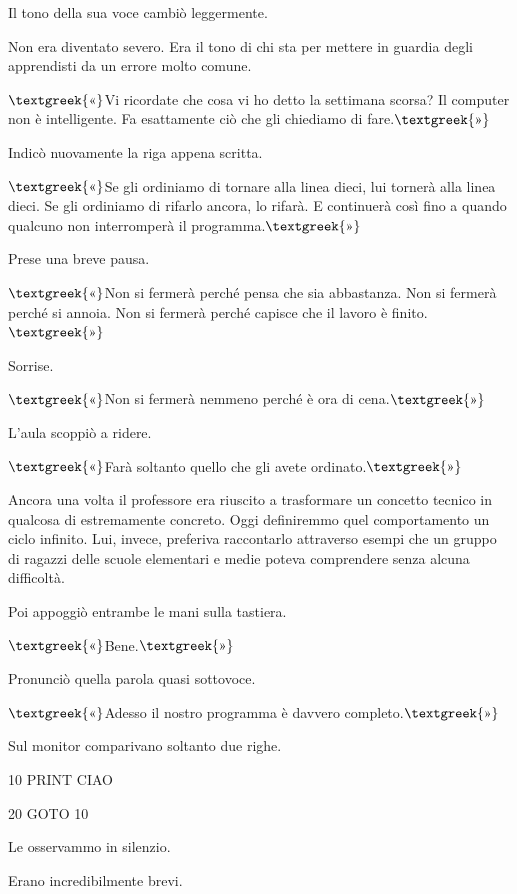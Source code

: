 \documentclass{article}
\begin{document}
Il tono della sua voce cambiò leggermente.

Non era diventato severo. Era il tono di chi sta per mettere in guardia degli apprendisti da un errore molto comune.

$\text{\textgreek{«}}$Vi ricordate che cosa vi ho detto la settimana scorsa? Il computer non è intelligente. Fa
esattamente ciò che gli chiediamo di fare.$\text{\textgreek{»}}$

Indicò nuovamente la riga appena scritta.

$\text{\textgreek{«}}$Se gli ordiniamo di tornare alla linea dieci, lui tornerà alla linea dieci. Se gli ordiniamo di
rifarlo ancora, lo rifarà. E continuerà così fino a quando qualcuno non interromperà il
programma.$\text{\textgreek{»}}$

Prese una breve pausa.

$\text{\textgreek{«}}$Non si fermerà perché pensa che sia abbastanza. Non si fermerà perché si annoia. Non si fermerà
perché capisce che il lavoro è finito.$\text{\textgreek{»}}$

Sorrise.

$\text{\textgreek{«}}$Non si fermerà nemmeno perché è ora di cena.$\text{\textgreek{»}}$

L'aula scoppiò a ridere.

$\text{\textgreek{«}}$Farà soltanto quello che gli avete ordinato.$\text{\textgreek{»}}$

Ancora una volta il professore era riuscito a trasformare un concetto tecnico in qualcosa di estremamente concreto. Oggi
definiremmo quel comportamento un ciclo infinito. Lui, invece, preferiva raccontarlo attraverso esempi che un gruppo di
ragazzi delle scuole elementari e medie poteva comprendere senza alcuna difficoltà.

Poi appoggiò entrambe le mani sulla tastiera.

$\text{\textgreek{«}}$Bene.$\text{\textgreek{»}}$

Pronunciò quella parola quasi sottovoce.

$\text{\textgreek{«}}$Adesso il nostro programma è davvero completo.$\text{\textgreek{»}}$

Sul monitor comparivano soltanto due righe.

10 PRINT {\textquotedbl}CIAO{\textquotedbl}

20 GOTO 10

Le osservammo in silenzio.

Erano incredibilmente brevi.
\end{document}
